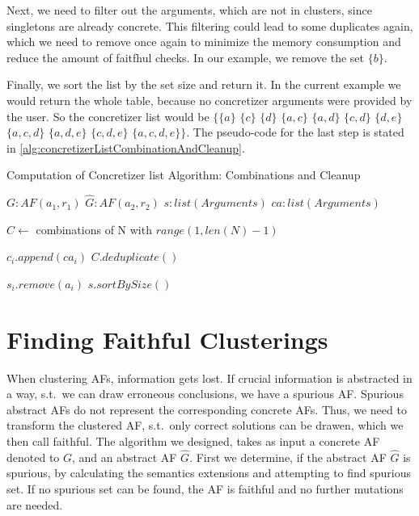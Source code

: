 Next, we need to filter out the arguments, which are not in clusters, since singletons are already concrete. This filtering could lead to some duplicates again, which we need to remove once again to minimize the memory consumption and reduce the amount of faitfhul checks. In our example, we remove the set $\{b\}$.

Finally, we sort the list by the set size and return it. In the current example we would return the whole table, because no concretizer arguments were provided by the user. So the concretizer list would be
$\bigl\{\{a\}$
$\{c\}$
$\{d\}$
$\{a, c\}$
$\{a, d\}$
$\{c, d\}$
$\{d, e\}$
$\{a, c, d\}$
$\{a, d, e\}$
$\{c, d, e\}$
$\{a, c, d, e\}\bigl\}$. The pseudo-code for the last step is stated in \cref{alg:concretizerListCombinationAndCleanup}.


\begin{algorithm}
    \caption{Computation of Concretizer list Algorithm: Combinations and Cleanup}\label{alg:concretizerListCombinationAndCleanup}
    \begin{algorithmic}[1]
        \Require $G: AF(a_1, r_1)$ 
        \Require $\hat{G}: AF(a_2, r_2)$ 
        \Require $s: list(Arguments)$ 
        \Require $ca: list(Arguments)$ 

        \State $C \gets$ combinations of N with $range(1, len(N)-1)$ 

         
                \State $c_i.append(ca_i)$
            \EndFor
        \EndFor
        \State $C.deduplicate()$

         
                    \State $s_i.remove(a_i)$
                \EndIf
            \EndFor
        \EndFor
        \State \Return $s.sortBySize()$
    \end{algorithmic}
\end{algorithm}

\newpage

\section{Finding Faithful Clusterings}
\label{sec:AlgorithmicApproachToComputeFaifthulClusterings}
When clustering AFs, information gets lost. If crucial information is abstracted in a way, s.t.\ we can draw erroneous conclusions, we have a spurious AF. Spurious abstract AFs do not represent the corresponding concrete AFs. Thus, we need to transform the clustered AF, s.t.\ only correct solutions can be drawen, which we then call faithful. The algorithm we designed, takes as input a concrete AF denoted to $G$, and an abstract AF $\hat{G}$. First we determine, if the abstract AF $\hat{G}$ is spurious, by calculating the semantics extensions and attempting to find spurious set. If no spurious set can be found, the AF is faithful and no further mutations are needed.

